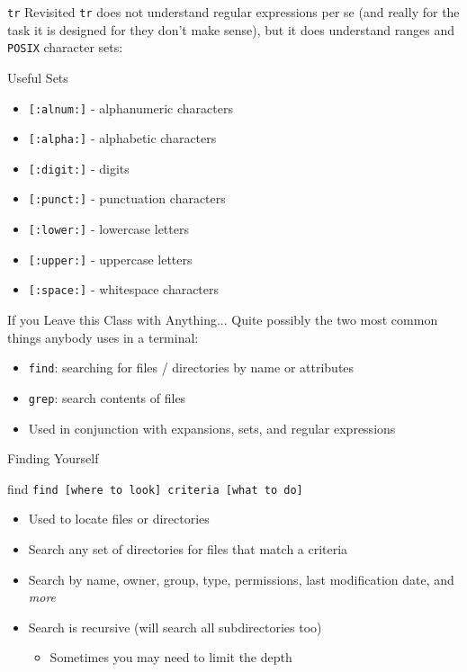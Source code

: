 \documentclass[11pt]{beamer}
\newcommand{\colbf}[1]{\textcolor{mLightBrown!77!black}{#1}}%
\def\wl{\par \vspace{\baselineskip}}                        %
\begin{document}
\begin{frame}[fragile]{\texttt{tr} Revisited}
  \texttt{tr} does not understand regular expressions per se (and really for the task it is designed for they
  don't make sense), but it \colbf{does} understand ranges and \texttt{POSIX} character sets:\wl
  \begin{block}{Useful Sets}
    \begin{itemize}
      \item \texttt{[:alnum:]} - alphanumeric characters
      \item \texttt{[:alpha:]} - alphabetic characters
      \item \texttt{[:digit:]} - digits
      \item \texttt{[:punct:]} - punctuation characters
      \item \texttt{[:lower:]} - lowercase letters
      \item \texttt{[:upper:]} - uppercase letters
      \item \texttt{[:space:]} - whitespace characters
    \end{itemize}
  \end{block}
\end{frame}

\begin{frame}[fragile]{If you Leave this Class with Anything...}
  Quite possibly the two most common things anybody uses in a terminal:

  \begin{itemize}[<+- | alert@+>]
    \item \texttt{find}: searching for files / directories by name or attributes
    \item \texttt{grep}: search contents of files
    \item Used in conjunction with expansions, sets, and regular expressions
  \end{itemize}
\end{frame}

\begin{frame}[fragile]{Finding Yourself}
  \begin{block}{\colbf{find}}
    \texttt{find [where to look] criteria [what to do]}
    \begin{itemize}
      \item Used to locate files or directories
      \item Search any set of directories for files that match a criteria
      \item Search by name, owner, group, type, permissions, last modification date, and \emph{more}
      \item Search is recursive (will search all subdirectories too)
      \begin{itemize}
        \item Sometimes you may need to limit the depth
      \end{itemize}
    \end{itemize}
  \end{block}
\end{frame}
\end{document}
